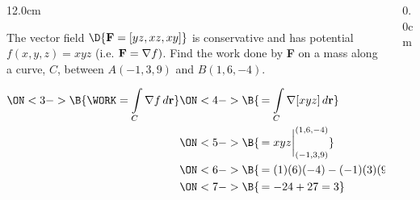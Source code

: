 \begin{frame}
\begin{columns}\begin{column}{12.0cm}

\vspace{0.1cm}

\scriptsize

\EX The vector field $\D{{\bf F} = [yz,xz,xy]}$ is conservative and has potential $f(x,y,z) = xyz$ (i.e. ${\bf F} = \nabla f)$.  Find the work done by {\bf F} on a mass along a curve, $C$, between $A(-1,3,9)$ and $B(1,6,-4)$. 

\vspace{0.2cm}

\SOL {}

\vspace{0.2cm}

\begin{align*}
	\ON<3->{\B{\WORK 
	    = \int \limits_{C} \nabla f \, d{\bf r} }}
	&\ON<4->{\B{\, = \int \limits_{C} \nabla[xyz] \, d{\bf r}}} \\
	&\ON<5->{\B{\, = xyz\biggr|_{(-1,3,9)}^{(1,6,-4)}}} \\
	&\ON<6->{\B{\, = (1)(6)(-4) - (-1)(3)(9)}} \\
	&\ON<7->{\B{\, = -24 + 27 = 3}}\\
\end{align*}

\vspace{3.2cm}

\end{column}\begin{column}{0.0cm}\end{column}\end{columns}
\end{frame}

